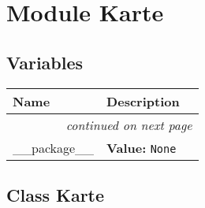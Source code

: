 %
%
%


\section{Module Karte}

    \label{Karte}


  \subsection{Variables}

    \vspace{-1cm}
\hspace{\varindent}\begin{longtable}{|p{\varnamewidth}|p{\vardescrwidth}|l}
\cline{1-2}
\cline{1-2} \centering \textbf{Name} & \centering \textbf{Description}& \\
\cline{1-2}
\endhead\cline{1-2}\multicolumn{3}{r}{\small\textit{continued on next page}}\\\endfoot\cline{1-2}
\endlastfoot\raggedright \_\-\_\-p\-a\-c\-k\-a\-g\-e\-\_\-\_\- & \raggedright \textbf{Value:} 
{\tt None}&\\
\cline{1-2}
\end{longtable}



\subsection{Class Karte}

    \label{Karte:Karte}

